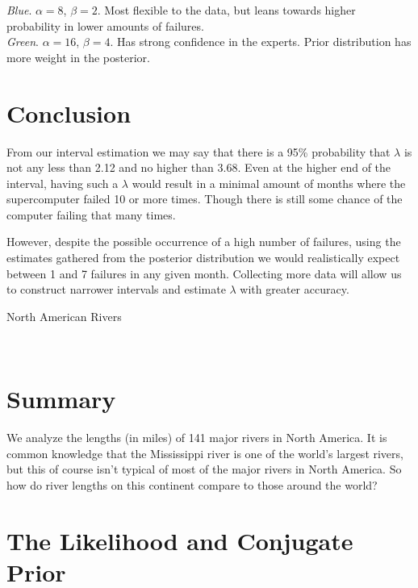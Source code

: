 \documentclass[12pt]{article}
\begin{document}
\noindent \textit{Blue}. $\alpha=8$, $\beta=2$.  Most flexible to the data, but leans towards higher probability in lower amounts of failures.  \\ [-0.3cm]

\noindent \textit{Green}. $\alpha=16$, $\beta=4$.  Has strong confidence in the experts.  Prior distribution has more weight in the posterior.


\section*{Conclusion}

\noindent From our interval estimation we may say that there is a 95\% probability that $\lambda$ is not any less than 2.12 and no higher than 3.68.  Even at the higher end of the interval, having such a $\lambda$ would result in a minimal amount of months where the supercomputer failed 10 or more times.  Though there is still some chance of the computer failing that many times.
\bigskip

\noindent However, despite the possible occurrence of a high number of failures, using the estimates gathered from the posterior distribution we would realistically expect between 1 and 7 failures in any given month.  Collecting more data will allow us to construct narrower intervals and estimate $\lambda$ with greater accuracy.

\newpage

\begin{center}
\begin{LARGE}
\sc North American Rivers
\end{LARGE}
\\ [.5 cm]
\end{center}

\section*{Summary}

\noindent We analyze the lengths (in miles) of 141 major rivers in North America.  It is common knowledge that the Mississippi river is one of the world's largest rivers, but this of course isn't typical of most of the major rivers in North America.  So how do river lengths on this continent compare to those around the world?

\section*{The Likelihood and Conjugate Prior}
\end{document}
